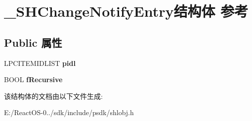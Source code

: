 \hypertarget{struct___s_h_change_notify_entry}{}\section{\+\_\+\+S\+H\+Change\+Notify\+Entry结构体 参考}
\label{struct___s_h_change_notify_entry}
\subsection*{Public 属性}
\begin{DoxyCompactItemize}
\item 
\mbox{\label{struct___s_h_change_notify_entry_a054ff65d11cadd8297ccbd696d2c66c2}} 
L\+P\+C\+I\+T\+E\+M\+I\+D\+L\+I\+ST {\bfseries pidl}
\item 
\mbox{\label{struct___s_h_change_notify_entry_afcce1ad78742d97ec2a8d504bfc66406}} 
B\+O\+OL {\bfseries f\+Recursive}
\end{DoxyCompactItemize}


该结构体的文档由以下文件生成\+:\begin{DoxyCompactItemize}
\item 
E\+:/\+React\+O\+S-\/0../sdk/include/psdk/shlobj.\+h\end{DoxyCompactItemize}
